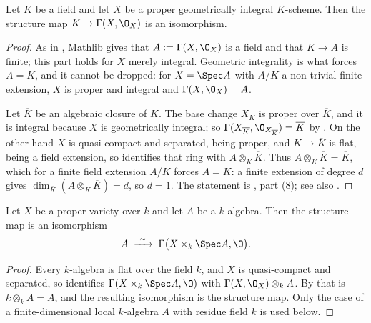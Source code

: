 \begin{lemma}
\label{lem:cube-global-sections-general}
Let $K$ be a field and let $X$ be a proper geometrically integral
$K$-scheme.  Then the structure map $K\to\Gamma(X,\O_X)$ is an isomorphism.
\end{lemma}
\begin{proof}
As in , Mathlib gives that
$A:=\Gamma(X,\O_X)$ is a field and that $K\to A$ is finite; this part holds
for $X$ merely integral.  Geometric integrality is what forces $A=K$, and it
cannot be dropped: for $X=\Spec A$ with $A/K$ a non-trivial finite extension,
$X$ is proper and integral and $\Gamma(X,\O_X)=A$.

Let $\overline K$ be an algebraic closure of $K$.  The base change
$X_{\overline K}$ is proper over $\overline K$, and it is integral because
$X$ is geometrically integral; so
$\Gamma(X_{\overline K},\O_{X_{\overline K}})=\overline K$ by
.  On the other hand $X$ is quasi-compact and
separated, being proper, and $K\to\overline K$ is flat, being a field
extension, so
 identifies that ring with
$A\otimes_K\overline K$.  Thus $A\otimes_K\overline K=\overline K$, which
for a finite field extension $A/K$ forces $A=K$: a finite extension of degree
$d$ gives $\dim_{\overline K}(A\otimes_K\overline K)=d$, so $d=1$.  The
statement is , part (8); see also .
\end{proof}

\begin{lemma}
\label{lem:cube-global-sections-base-change}
\leanok
Let $X$ be a proper variety over $k$ and let $A$ be a $k$-algebra.  Then the
structure map is an isomorphism
\[
  A\;\xrightarrow{\ \sim\ }\;\Gamma\bigl(X\times_k\Spec A,\O\bigr).
\]
\end{lemma}
\begin{proof}
\leanok
Every $k$-algebra is flat over the field $k$, and $X$ is quasi-compact and
separated, so  identifies
$\Gamma(X\times_k\Spec A,\O)$ with $\Gamma(X,\O_X)\otimes_kA$.  By
 that is $k\otimes_kA=A$, and the resulting
isomorphism is the structure map.  Only the case of a finite-dimensional local
$k$-algebra $A$ with residue field $k$ is used below.
\end{proof}

